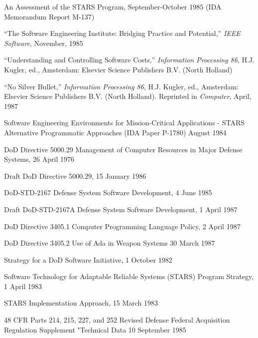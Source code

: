 \documentclass[12pt]{article}
\begin{document}
\begin{description}[leftmargin=2in,style=sameline]
    \item [Bailey, Elizabeth, \textit{et al}] An Assessment of the STARS Program, September-October 1985 (IDA Memorandum Report M-137)

    \item [Barbacci, M.R. \textit{et al}] “The Software Engineering Institute: Bridging Practice
        and Potential,” \emph{IEEE Software}, November, 1985

    \item [Boehm, Barry W.] “Understanding and Controlling Software Costs,” \emph{Information Processing 86}, H.J. Kugler, ed., Amsterdam: Elsevier Science Publishers B.V. (North Holland)

    \item [Brocks, Frederick P.] “No Silver Bullet,” \emph{Information Processing 86}, H.J. Kugler, ed., Amsterdam: Elsevier Science Publishers B.V.  (North Holland). Reprinted in \emph{Computer}, April, 1987

    \item [DeMillo, Richard A., \textit{et al}] Software Engineering Environments for Mission-Critical Applications - STARS Alternative Programmatic Approaches (IDA Paper P-1780) August 1984

    \item [DoD]
        DoD Directive 5000.29 Management of Computer Resources in Major
        Defense Systems, 26 April 1976

        Draft DoD Directive 5000.29, 15 January
        1986

        DoD-STD-2167 Defense System Software Development, 4 June 1985

        Draft DoD-STD-2167A Defense System Software Development, 1 April 1987

        DoD Directive 3405.1 Computer Programming Language Policy, 2 April 1987

        DoD Directive 3405.2 Use of Ada in Weapon Systems 30 March 1987

        Strategy for a DoD Software Initiative, 1 October 1982

        Software Technology for Adaptable Reliable Systems (STARS) Program Strategy, 1
        April 1983

        STARS Implementation Approach, 15 March 1983

        48 CFR Parts 214, 215, 227, and 252 Revised Defense Federal Acquisition Regulation
        Supplement "Technical Data 10 September 1985


\end{description}
\end{document}

